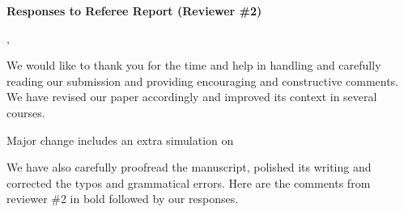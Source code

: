 \documentclass[twoside,11pt]{article}
\begin{document}
\begin{center}
{\Large \textbf{Responses to Referee Report (Reviewer \#2)}}
\end{center}

,

We would like to thank you for the time and help in handling and carefully reading our submission and providing encouraging and constructive comments.  We have revised our paper accordingly and improved its context in several courses. 

Major change includes an extra simulation on

We have also carefully proofread the manuscript, polished its writing and corrected the typos and grammatical errors.  Here are the comments from reviewer \#2 in bold followed by our responses.
\end{document}
